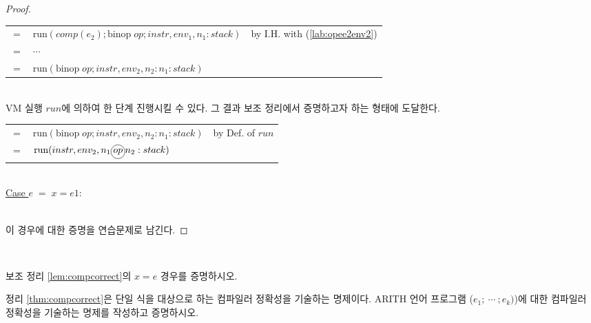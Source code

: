 \documentclass[runningheads]{llncs}
\newcommand{\circledop}[1]{%
    \tikz[baseline=(X.base)] \node[draw, shape=circle, inner sep=1pt] (X) {\ensuremath{#1}};%
}
\begin{document}
\begin{proof}
\begin{tabular}{l l l}
   $=$ & $\text{run}(comp(e_2); \text{binop} \; op; instr, env_1, n_1:stack)$ & by I.H. with (\ref{lab:opee2env2})\\
   $=$ & $\cdots$ & \\
   $=$ & $\text{run}(\text{binop} \; op; instr, env_2, n_2:n_1:stack)$ & %
\end{tabular}

\ \\ 

VM 실행 $run$에 의하여 한 단계 진행시킬 수 있다. 그 결과 보조 정리에서 증명하고자 하는 형태에 도달한다.

\begin{tabular}{l l l}
   $=$ & $\text{run}(\text{binop} \; op; instr, env_2, n_2:n_1:stack)$ & by Def. of $run$\\
   $=$ & $\text{run}(instr, env_2, n_1 \circledop{op} n_2 : stack)$ & \\
\end{tabular}

\ \\ 

\underline{Case $e\; = \; x=e1$}: 

\ \\

이 경우에 대한 증명을 연습문제로 남긴다.

\end{proof}

\ \\

\begin{exercise}
    보조 정리 \ref{lem:compcorrect}의 $x=e$ 경우를 증명하시오.
\end{exercise}

\begin{exercise}
    정리 \ref{thm:compcorrect}은 단일 식을 대상으로 하는 컴파일러 정확성을 기술하는 명제이다. 
    ARITH 언어 프로그램 ($e_1; \ \cdots \ ; e_k)$)에 대한 컴파일러 정확성을 기술하는 명제를 작성하고 증명하시오.
\end{exercise}

\end{document}
